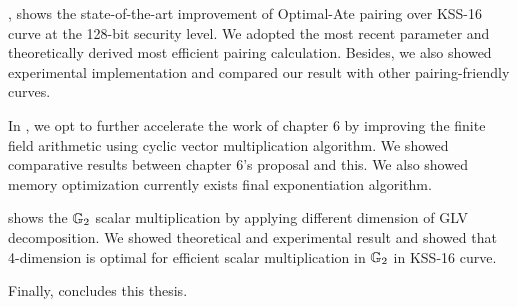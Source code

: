 , shows the state-of-the-art improvement of Optimal-Ate pairing over KSS-16 curve at the 128-bit security level.
We adopted the most recent parameter and theoretically derived most efficient pairing calculation.
Besides, we also showed experimental implementation and compared our result with other pairing-friendly curves.


In , we opt to further accelerate the work of chapter 6 by improving the finite field arithmetic using cyclic vector multiplication algorithm.
We showed comparative results between chapter 6's proposal and this. 
We also showed memory optimization currently exists final exponentiation algorithm.

 shows the   ${\mathbb{G}}_{2}$  scalar multiplication by applying different dimension of GLV decomposition.
We showed theoretical and experimental result and showed that 4-dimension is optimal for efficient scalar multiplication in  ${\mathbb{G}}_{2}$ in KSS-16 curve.

Finally,  concludes this thesis.


	

